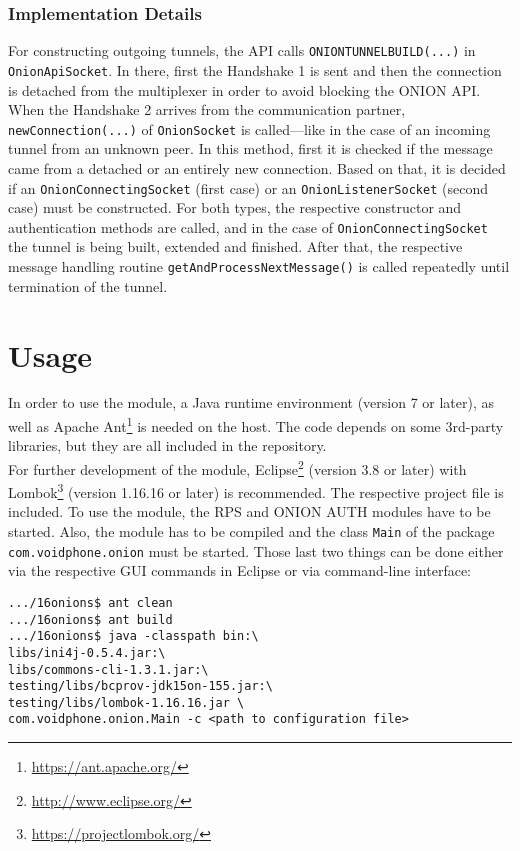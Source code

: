 \documentclass{article}
\begin{document}
	\subsubsection{Implementation Details}
	For constructing outgoing tunnels, the API calls \texttt{ONIONTUNNELBUILD(...)} in \texttt{OnionApiSocket}. In there, first the Handshake 1 is sent and then the connection is detached from the multiplexer in order to avoid blocking the ONION API. \\
	When the Handshake 2 arrives from the communication partner,  \\
	\texttt{newConnection(...)} of \texttt{OnionSocket} is called---like in the case of an incoming tunnel from an unknown peer. In this method, first it is checked if the message came from a detached or an entirely new connection. Based on that, it is decided if an \texttt{OnionConnectingSocket} (first case) or an \texttt{OnionListenerSocket} (second case) must be constructed. For both types, the respective constructor and authentication methods are called, and in the case of \texttt{OnionConnectingSocket} the tunnel is being built, extended and finished. After that, the respective message handling routine \texttt{getAndProcessNextMessage()} is called repeatedly until termination of the tunnel.

\section{Usage}
In order to use the module, a Java runtime environment (version 7 or later), as well as Apache Ant\footnote{\url{https://ant.apache.org/}} is needed on the host. The code depends on some 3rd-party libraries, but they are all included in the repository. \\
For further development of the module, Eclipse\footnote{\url{http://www.eclipse.org/}} (version 3.8 or later) with Lombok\footnote{\url{https://projectlombok.org/}} (version 1.16.16 or later) is recommended. The respective project file is included.
To use the module, the RPS and ONION AUTH modules have to be started. Also, the module has to be compiled and the class \texttt{Main} of the package \texttt{com.voidphone.onion} must be started. Those last two things can be done either via the respective GUI commands in Eclipse or via command-line interface:
\begin{lstlisting}
.../16onions$ ant clean
.../16onions$ ant build
.../16onions$ java -classpath bin:\
libs/ini4j-0.5.4.jar:\
libs/commons-cli-1.3.1.jar:\
testing/libs/bcprov-jdk15on-155.jar:\
testing/libs/lombok-1.16.16.jar \
com.voidphone.onion.Main -c <path to configuration file>
\end{lstlisting}
\end{document}
